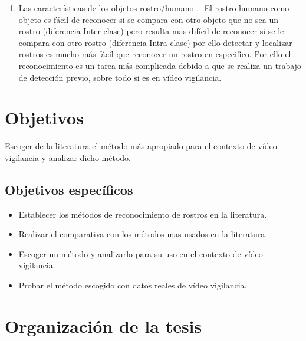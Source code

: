 \begin{enumerate}[1.]
\item Las características de los objetos rostro/humano \cite{zhao2003face}.- El rostro humano como objeto es fácil de reconocer si se compara con otro objeto que no sea un rostro (diferencia Inter-clase) pero resulta mas difícil de reconocer si se le compara con otro rostro (diferencia Intra-clase) por ello detectar y localizar rostros es mucho más fácil que reconocer un rostro en especifico. Por ello el reconocimiento es un tarea más complicada debido a que se realiza un trabajo de detección previo, sobre todo si es en vídeo vigilancia.

\end{enumerate}


\section{Objetivos}
Escoger de la literatura el método más apropiado para el contexto de vídeo vigilancia y analizar dicho método.

\subsection{Objetivos específicos}


\begin{itemize}
\item Establecer los métodos de reconocimiento de rostros en la literatura.
\item Realizar el comparativa con los métodos mas usados en la literatura.
\item Escoger un método y analizarlo para su uso en el contexto de vídeo vigilancia.
\item Probar el método escogido con datos reales de vídeo vigilancia. 
\end{itemize}


\section{Organización de la tesis}


